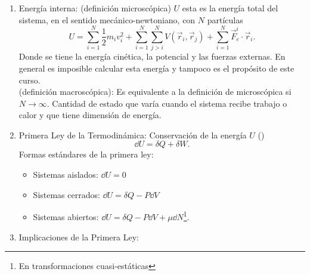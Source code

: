 \begin{enumerate}
	\item Energía interna: (definición microscópica) $U$ esta es la energía total del sistema, en el sentido mecánico-newtoniano, con  $N$ partículas
		$$ U = \sum _{i=1} ^N \frac{1}{2} m_i v_i ^2 + \sum _{i=1} ^N \sum _{j > i} ^N V(\vec{r}_i ,\vec{r}_j) + \sum _{i=1} ^N \vec{F} _e ^i \cdot \vec{r}_i . $$
	Donde se tiene la energía cinética, la potencial y las fuerzas externas. En general es imposible calcular esta energía y tampoco es el propósito de este curso.  \\
	(definición macroscópica): Es equivalente a la definición de microscópica si $N\to \infty$. Cantidad de estado que varía cuando el sistema recibe trabajo o calor y que tiene dimensión de energía.
	\item Primera Ley de la Termodinámica: Conservación de la energía $U$ () 
		$$ \dd{U} = \delta Q + \delta W. $$
	Formas estándares de la primera ley:
	\begin{itemize}
		\item Sistemas aislados: $\dd{U} = 0$
		\item Sistemas cerrados: $\dd{U} = \delta Q - P\dd{V}$
		\item Sistemas abiertos: $\dd{U} = \delta Q - P\dd{V} + \mu \dd{N}$\footnote{En transformaciones cuasi-estáticas}.
	\end{itemize}
	\item Implicaciones de la Primera Ley: 
\end{enumerate}































